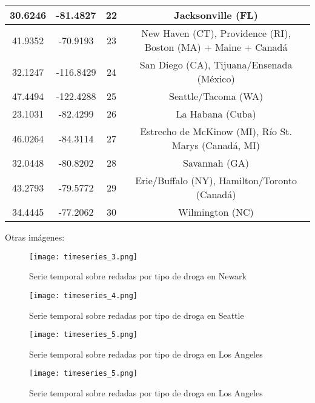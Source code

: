 \documentclass[12pt]{article}
\begin{document}
\begin{table}[H]
\begin{tabular}{|c|c|c|c|}
		\hline
		30.6246 & -81.4827 & 22  & Jacksonville (FL) \\
		\hline
		41.9352 & -70.9193 & 23  & New Haven (CT), Providence (RI), Boston (MA) + Maine + Canadá \\
		\hline
		32.1247 & -116.8429 & 24  & San Diego (CA), Tijuana/Ensenada (México) \\
		\hline
		47.4494 & -122.4288 & 25  & Seattle/Tacoma (WA) \\
		\hline
		23.1031 & -82.4299 & 26  & La Habana (Cuba) \\
		\hline
		46.0264 & -84.3114 & 27  & Estrecho de McKinow (MI), Río St. Marys (Canadá, MI) \\
		\hline
		32.0448 & -80.8202 & 28  & Savannah (GA) \\
		\hline
		43.2793 & -79.5772 & 29  & Erie/Buffalo (NY), Hamilton/Toronto (Canadá) \\
		\hline
		34.4445 & -77.2062 & 30  & Wilmington (NC) \\
		\hline
	\end{tabular}
\end{table}

\newpage
Otras imágenes:

\begin{figure}[H]
	\caption{\label{timeseries_3} Serie temporal sobre redadas por tipo de droga en Newark}
	\centering
	\hspace*{1cm}
	\texttt{[image: timeseries\_3.png]}
\end{figure}

\begin{figure}[H]
	\caption{\label{timeseries_4} Serie temporal sobre redadas por tipo de droga en Seattle}
	\centering
	\hspace*{1cm}
	\texttt{[image: timeseries\_4.png]}
\end{figure}

\begin{figure}[H]
	\caption{\label{timeseries_5} Serie temporal sobre redadas por tipo de droga en Los Angeles}
	\centering
	\hspace*{1cm}
	\texttt{[image: timeseries\_5.png]}
\end{figure}

\begin{figure}[H]
	\caption{\label{timeseries_5} Serie temporal sobre redadas por tipo de droga en Los Angeles}
	\centering
	\hspace*{1cm}
	\texttt{[image: timeseries\_5.png]}
\end{figure}
\end{document}

